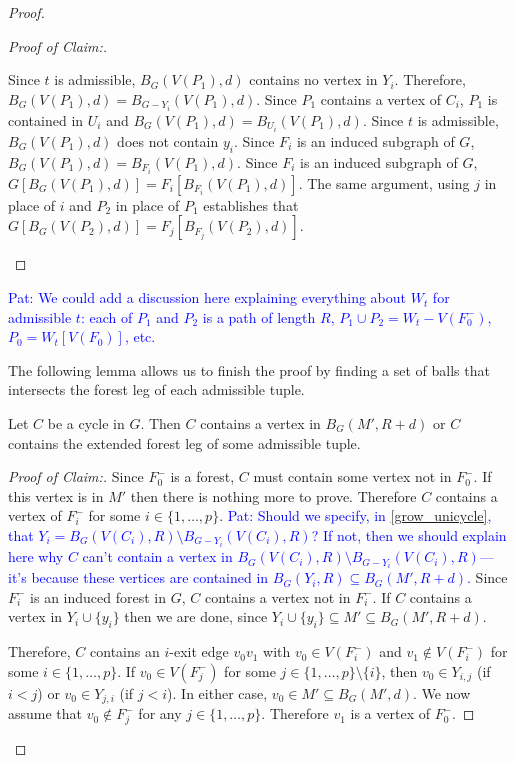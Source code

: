 \documentclass{patmorin}
\newcommand{\pat}[1]{\textcolor{Blue}{Pat: #1}}
\newenvironment{clmproof}{\begin{proof}[Proof of Claim:]\renewcommand{\qedsymbol}{\rule{1ex}{1ex}}}{\end{proof}}
\begin{document}
\begin{proof}
\begin{clmproof}
\begin{compactenum}[(i)]
    \item Since $t$ is admissible, $B_G(V(P_1),d)$ contains no vertex in $Y_i$.  Therefore,
    $B_G(V(P_1),d)=B_{G-Y_i}(V(P_1),d)$. Since $P_1$ contains a vertex of $C_i$, $P_1$ is contained in $U_i$ and $B_G(V(P_1),d)=B_{U_i}(V(P_1),d)$.  Since $t$ is admissible, $B_G(V(P_1),d)$ does not contain $y_i$.  Since $F_i$ is an induced subgraph of $G$, $B_G(V(P_1),d)=B_{F_i}(V(P_1),d)$.  Since $F_i$ is an induced subgraph of $G$, $G[B_G(V(P_1),d)]=F_i[B_{F_i}(V(P_1),d)]$.  The same argument, using $j$ in place of $i$ and $P_2$ in place of $P_1$ establishes that $G[B_G(V(P_2),d)]=F_j[B_{F_j}(V(P_2),d)]$. \qedhere
  \end{compactenum}
\end{clmproof}

\pat{We could add a discussion here explaining everything about $W_t$ for admissible $t$: each of $P_1$ and $P_2$ is a path of length $R$, $P_1\cup P_2=W_t-V(F^-_0)$, $P_0=W_t[V(F_0)]$, etc.}

The following lemma allows us to finish the proof by finding a set of balls that intersects the forest leg of each admissible tuple.

\begin{clm}\label{hit_cycle}
  Let $C$ be a cycle in $G$.  Then  $C$ contains a vertex in $B_G(M',R+d)$ or $C$ contains the extended forest leg of some admissible tuple.
\end{clm}

\begin{clmproof}
  Since $F_0^-$ is a forest, $C$ must contain some vertex not in $F_0^-$.  If this vertex is in $M'$ then there is nothing more to prove. Therefore $C$ contains a vertex of $F^-_i$ for some $i\in\{1,\ldots,p\}$. \pat{Should we specify, in \cref{grow_unicycle}, that $Y_i=B_G(V(C_i),R)\setminus B_{G-Y_i}(V(C_i),R)$?  If not, then we should explain here why $C$ can't contain a vertex in $B_G(V(C_i),R)\setminus B_{G-Y_i}(V(C_i),R)$---it's because these vertices are contained in $B_G(Y_i,R)\subseteq B_G(M',R+d)$.}  Since $F^-_i$ is an induced forest in $G$, $C$ contains a vertex not in $F^-_i$. If $C$ contains a vertex in $Y_i\cup\{y_i\}$ then we are done, since $Y_i\cup\{y_i\}\subseteq M'\subseteq B_G(M',R+d)$.

  Therefore, $C$ contains an $i$-exit edge $v_0v_1$ with $v_0\in V(F^-_i)$ and $v_1\not\in V(F^-_i)$ for some $i\in\{1,\ldots,p\}$.  If $v_0\in V(F^-_j)$ for some $j\in\{1,\ldots,p\}\setminus\{i\}$, then $v_0\in Y_{i,j}$ (if $i< j$) or $v_0\in Y_{j,i}$ (if $j<i$).  In either case, $v_0\in M'\subseteq B_G(M',d)$.  We now assume that $v_0\notin F^-_j$ for any $j\in\{1,\ldots,p\}$.  Therefore $v_1$ is a vertex of $F_0^-$.


\end{clmproof}
\end{proof}
\end{document}
